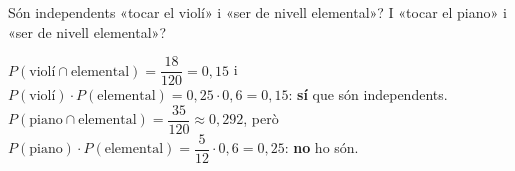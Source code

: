 \begin{apartats}
\begin{nomesllarg}
Són independents «tocar el violí» i «ser de nivell elemental»? I «tocar el piano» i «ser de nivell
elemental»?

\begin{solucio}
$P(\text{violí}\cap\text{elemental})=\dfrac{18}{120}=0{,}15$ i
$P(\text{violí})\cdot P(\text{elemental})=0{,}25\cdot0{,}6=0{,}15$: \textbf{sí} que són independents.\\
$P(\text{piano}\cap\text{elemental})=\dfrac{35}{120}\approx0{,}292$, però
$P(\text{piano})\cdot P(\text{elemental})=\dfrac5{12}\cdot0{,}6=0{,}25$: \textbf{no} ho són.
\end{solucio}
\end{nomesllarg}

\end{apartats}
